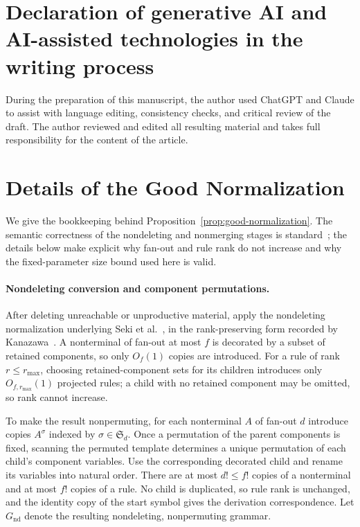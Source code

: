 \documentclass[11pt]{article}
\numberwithin{equation}{section}
\theoremstyle{plain}
\theoremstyle{definition}
\theoremstyle{remark}
\begin{document}
\section*{Declaration of generative AI and AI-assisted technologies in the writing process}
During the preparation of this manuscript, the author used ChatGPT and Claude
to assist with language editing, consistency checks, and critical review of the
draft.  The author reviewed and edited all resulting material and takes full
responsibility for the content of the article.

\appendix
\section{Details of the Good Normalization}
\label{app:normalization-details}

We give the bookkeeping behind Proposition~\ref{prop:good-normalization}.
The semantic correctness of the nondeleting and nonmerging stages is
standard~\cite{SekiEtAl1991,Kanazawa2019Ogden,Yoshinaka2011}; the details
below make explicit why fan-out and rule rank do not increase and why the
fixed-parameter size bound used here is valid.

\paragraph{Nondeleting conversion and component permutations.}
After deleting unreachable or unproductive material, apply the nondeleting normalization
underlying Seki et al.~\cite[proof of Lemma~2.2]{SekiEtAl1991}, in the
rank-preserving form recorded by Kanazawa~\cite[Section~2.1]{Kanazawa2019Ogden}.
A nonterminal of fan-out at most $f$ is decorated by a subset of retained
components, so only $O_f(1)$ copies are introduced.  For a rule of rank
$r\le r_{\max}$, choosing retained-component sets for its children introduces
only $O_{f,r_{\max}}(1)$ projected rules; a child with no retained component
may be omitted, so rank cannot increase.

To make the result nonpermuting, for each nonterminal $A$ of fan-out $d$
introduce copies $A^\sigma$ indexed by $\sigma\in\mathfrak S_d$.  Once a
permutation of the parent components is fixed, scanning the permuted template
determines a unique permutation of each child's component variables.  Use the
corresponding decorated child and rename its variables into natural order.
There are at most $d!\le f!$ copies of a nonterminal and at most $f!$ copies
of a rule.  No child is duplicated, so rule rank is unchanged, and the
identity copy of the start symbol gives the derivation correspondence.  Let
$G_{\mathrm{nd}}$ denote the resulting nondeleting, nonpermuting grammar.
\end{document}
